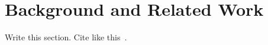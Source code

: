 \section{Background and Related Work}\label{sec:related_work}

Write this section. Cite like this~\cite{example2024}.
